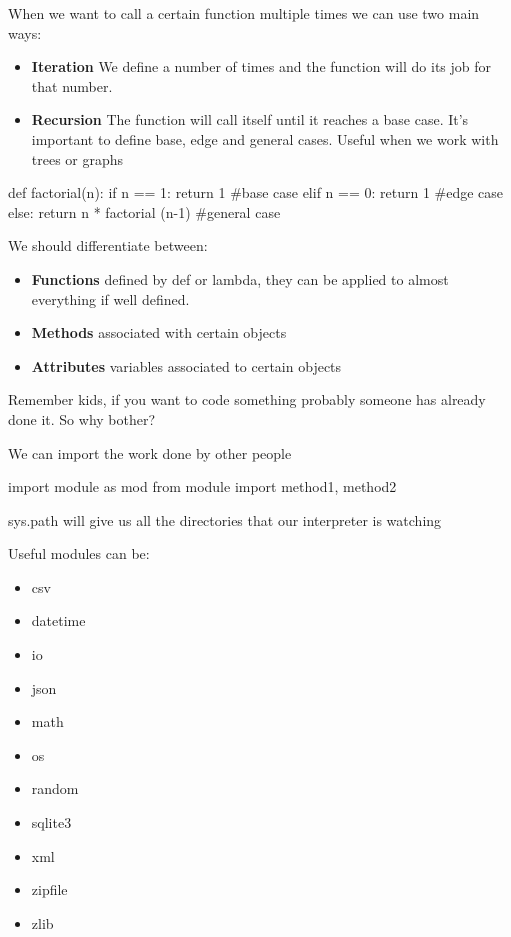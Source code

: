\vspace{10pt}

When we want to call a certain function multiple times we can use two main ways:

\begin{itemize}
    \item \textbf{Iteration} \ra We define a number of times and the function will do its job for that number.

    \item \textbf{Recursion} \ra The function will call itself until it reaches a base case. It's important to define base, edge and general cases. Useful when we work with trees or graphs
    
\end{itemize}

\begin{pythoncode}
    def factorial(n):
    if n == 1:
        return 1   #base case
    elif n == 0:
        return 1   #edge case
    else:
        return n * factorial (n-1) #general case
\end{pythoncode}

\vspace{10pt}

We should differentiate between:

\begin{itemize}
    \item \textbf{Functions} \ra defined by def or lambda, they can be applied to almost everything if well defined.
    \item \textbf{Methods} \ra associated with certain objects
    \item \textbf{Attributes} \ra variables associated to certain objects
\end{itemize}

\vspace{10pt}

Remember kids, if you want to code something probably someone has already done it. So why bother?

We can import the work done by other people

\begin{pythoncode}
    import module as mod
    from module import method1, method2

\end{pythoncode}

sys.path will give us all the directories that our interpreter is watching

Useful modules can be:
\begin{itemize}
    \item csv
    \item datetime
    \item io
    \item json
    \item math
    \item os
    \item random
    \item sqlite3
    \item xml
    \item zipfile
    \item zlib
\end{itemize}

